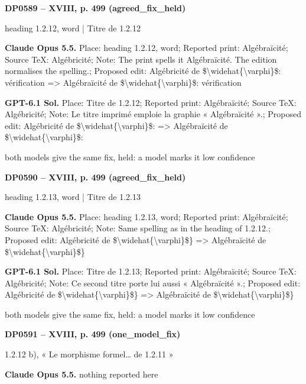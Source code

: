 \par\noindent\hypertarget{DP0589}{}\textbf{DP0589 -- XVIII, p. 499 (agreed\_fix\_held)}\par
heading 1.2.12, word | Titre de 1.2.12\par
\textbf{Claude Opus 5.5.} Place: heading 1.2.12, word; Reported print: Algébraïcité; Source TeX: Algébricité; Note: The print spells it Algébraïcité. The edition normalises the spelling.; Proposed edit: Algébricité de \$\textbackslash{}widehat\{\textbackslash{}varphi\}\$: vérification =\allowbreak > Algébraïcité de \$\textbackslash{}widehat\{\textbackslash{}varphi\}\$: vérification\par
\textbf{GPT-6.1 Sol.} Place: Titre de 1.2.12; Reported print: Algébraïcité; Source TeX: Algébricité; Note: Le titre imprimé emploie la graphie « Algébraïcité ».; Proposed edit: Algébricité de \$\textbackslash{}widehat\{\textbackslash{}varphi\}\$: =\allowbreak > Algébraïcité de \$\textbackslash{}widehat\{\textbackslash{}varphi\}\$:\par
both models give the same fix, held: a model marks it low confidence\par
\par\noindent\hypertarget{DP0590}{}\textbf{DP0590 -- XVIII, p. 499 (agreed\_fix\_held)}\par
heading 1.2.13, word | Titre de 1.2.13\par
\textbf{Claude Opus 5.5.} Place: heading 1.2.13, word; Reported print: Algébraïcité; Source TeX: Algébricité; Note: Same spelling as in the heading of 1.2.12.; Proposed edit: Algébricité de \$\textbackslash{}widehat\{\textbackslash{}varphi\}\$\} =\allowbreak > Algébraïcité de \$\textbackslash{}widehat\{\textbackslash{}varphi\}\$\}\par
\textbf{GPT-6.1 Sol.} Place: Titre de 1.2.13; Reported print: Algébraïcité; Source TeX: Algébricité; Note: Ce second titre porte lui aussi « Algébraïcité ».; Proposed edit: Algébricité de \$\textbackslash{}widehat\{\textbackslash{}varphi\}\$\} =\allowbreak > Algébraïcité de \$\textbackslash{}widehat\{\textbackslash{}varphi\}\$\}\par
both models give the same fix, held: a model marks it low confidence\par
\par\noindent\hypertarget{DP0591}{}\textbf{DP0591 -- XVIII, p. 499 (one\_model\_fix)}\par
1.2.12 b), « Le morphisme formel… de 1.2.11 »\par
\textbf{Claude Opus 5.5.} nothing reported here\par
